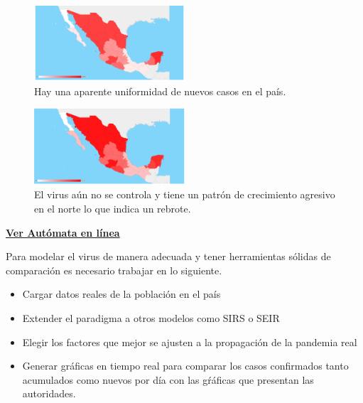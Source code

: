 \begin{figure}[h]
	\centering
	\includegraphics[width=0.5\textwidth]{capitulo2/images/map_images/Captura de pantalla_2020-06-20_15-51-52.png}
	\caption{Hay una aparente uniformidad de nuevos casos en el país.}
	\label{fig:04_prop}
\end{figure}

\begin{figure}[h]
	\centering
	\includegraphics[width=0.5\textwidth]{capitulo2/images/map_images/Captura de pantalla_2020-06-20_15-53-01.png}
	\caption{El virus aún no se controla y tiene un patrón de crecimiento  agresivo en el norte lo que indica un rebrote.}
	\label{fig:06_prop}
\end{figure}

\href{https://qapolo.github.io/05_CovidProj/index.html}{\textbf{Ver Autómata en línea}}

Para modelar el virus de manera adecuada y tener herramientas sólidas de comparación es necesario trabajar en lo siguiente.
\begin{itemize}
	\item Cargar datos reales de la población en el país
	\item Extender el paradigma a otros modelos como SIRS o SEIR
	\item Elegir los factores que mejor se ajusten a la propagación de la pandemia real
	\item Generar gráficas en tiempo real para comparar los casos confirmados tanto acumulados como nuevos por día con las gŕáficas que presentan las autoridades.
\end{itemize}



%

